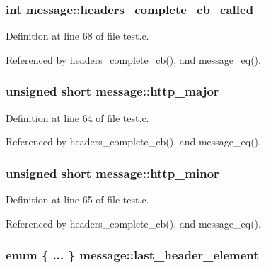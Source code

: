 \subsubsection[{headers\+\_\+complete\+\_\+cb\+\_\+called}]{\setlength{\rightskip}{0pt plus 5cm}int message\+::headers\+\_\+complete\+\_\+cb\+\_\+called}\label{structmessage_a2bc03590b604eb21c6cfb25a00d07ce1}


Definition at line 68 of file test.\+c.



Referenced by headers\+\_\+complete\+\_\+cb(), and message\+\_\+eq().

\subsubsection[{http\+\_\+major}]{\setlength{\rightskip}{0pt plus 5cm}unsigned short message\+::http\+\_\+major}\label{structmessage_aa671065d5218209150105b1198c28356}


Definition at line 64 of file test.\+c.



Referenced by headers\+\_\+complete\+\_\+cb(), and message\+\_\+eq().

\subsubsection[{http\+\_\+minor}]{\setlength{\rightskip}{0pt plus 5cm}unsigned short message\+::http\+\_\+minor}\label{structmessage_a45ab019e4c8ab0aa6721e46889df09eb}


Definition at line 65 of file test.\+c.



Referenced by headers\+\_\+complete\+\_\+cb(), and message\+\_\+eq().

\subsubsection[{last\+\_\+header\+\_\+element}]{\setlength{\rightskip}{0pt plus 5cm}enum \{ ... \}   message\+::last\+\_\+header\+\_\+element}\label{structmessage_a8efddec3a432612d5ef8a820e80a6c34}


